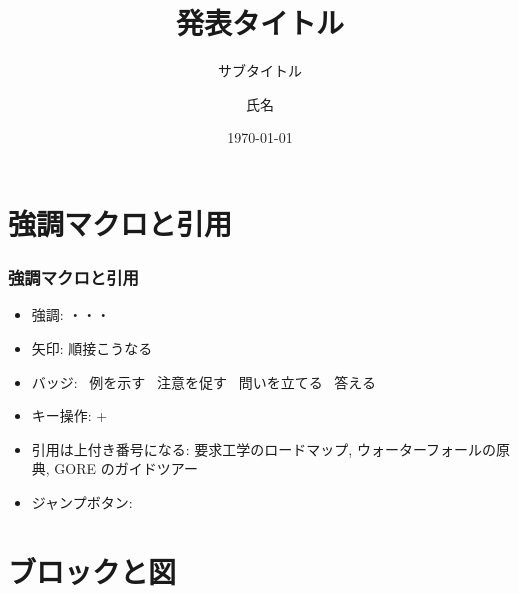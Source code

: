 \documentclass[aspectratio=169, 10pt, fleqn, hyperref={pdfpagelabels=false, bookmarks=false, hyperfootnotes=false}]{beamer}
\title{発表タイトル}
\subtitle{\fontsize{10pt}{0pt}\selectfont {\emdash}サブタイトル{\emdash}}
\author{氏名}
\institute{} %
\date{\footnotesize{\today}}
\begin{document}
\addtocounter{framenumber}{-1} %

\begin{frame}[label=title]
  \titlepage
\end{frame}

\section{強調マクロと引用}

\begin{frame}[label=macros]
  \frametitle{強調マクロと引用}
  \begin{itemize}
    \item 強調: ・・・
    \item 矢印: 順接\arrow こうなる
    \item バッジ: \examplebadge~例を示す \notebadge~注意を促す \questionbadge~問いを立てる \answerbadge~答える
    \item キー操作: +
    \item 引用は上付き番号になる:
      要求工学のロードマップ\cite{nuseibeh2000},
      ウォーターフォールの原典\cite{royce1970},
      GORE のガイドツアー\cite{vanlamsweerde2001}
    \item ジャンプボタン: 
  \end{itemize}
\end{frame}

\section{ブロックと図}
\end{document}

